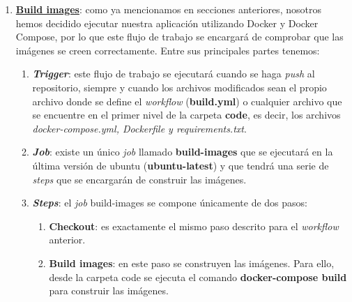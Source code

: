 \begin{enumerate}
        \item \textbf{\href{https://github.com/alexespana/TFG/actions/workflows/build.yml}
        {Build images}}: como ya mencionamos en secciones anteriores, nosotros hemos decidido
        ejecutar nuestra aplicación utilizando Docker y Docker Compose, por lo que este flujo
        de trabajo se encargará de comprobar que las imágenes se creen correctamente. Entre
        sus principales partes tenemos:
            \begin{enumerate}
                \item \textbf{\textit{Trigger}}: este flujo de trabajo se ejecutará cuando
                se haga \textit{push} al repositorio, siempre y cuando los archivos
                modificados sean el propio archivo donde se define el \textit{workflow}
                (\textbf{build.yml}) o cualquier archivo que se encuentre en el primer nivel
                de la carpeta \textbf{code}, es decir, los archivos
                \textit{docker-compose.yml, Dockerfile y requirements.txt}.
                \item \textbf{\textit{Job}}: existe un único \textit{job} llamado
                \textbf{build-images} que se ejecutará en la última versión de ubuntu
                (\textbf{ubuntu-latest}) y que tendrá una serie de \textit{steps} que se
                encargarán de construir las imágenes.
                \item \textbf{\textit{Steps}}: el \textit{job} build-images se compone
                únicamente de dos pasos:
                    \begin{enumerate}
                        \item \textbf{Checkout}: es exactamente el mismo paso descrito para
                        el \textit{workflow} anterior.
                        \item \textbf{Build images}: en este paso se construyen las
                        imágenes. Para ello, desde la carpeta code se ejecuta el comando
                        \textbf{docker-compose build} para construir las imágenes.
                    \end{enumerate}
            \end{enumerate}


\end{enumerate}
